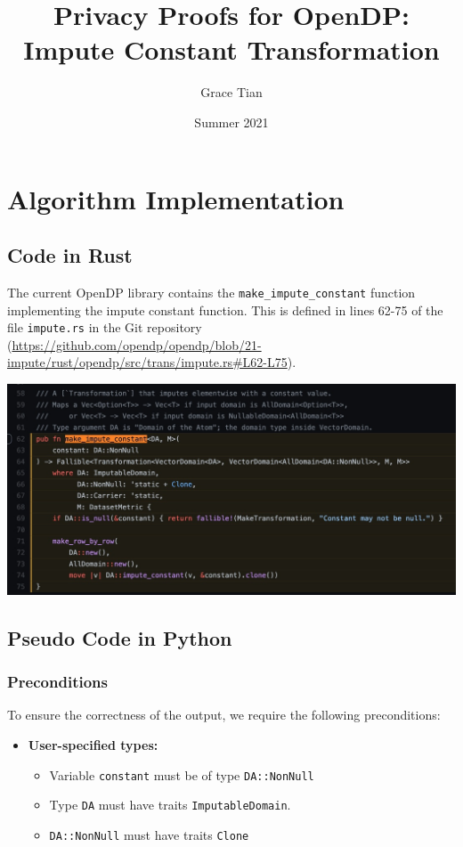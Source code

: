 \documentclass[11pt,a4paper]{article}
\title{Privacy Proofs for OpenDP: Impute Constant Transformation}
\author{Grace Tian}
\date{Summer 2021}
\begin{document}
\maketitle
\tableofcontents

\section{Algorithm Implementation}
\subsection{Code in Rust}
The current OpenDP library contains the \texttt{make\_impute\_constant} function implementing the impute constant function. This is defined in lines 62-75 of the file \texttt{impute.rs} in the Git repository (\url{https://github.com/opendp/opendp/blob/21-impute/rust/opendp/src/trans/impute.rs#L62-L75}).

\includegraphics[width=\textwidth]{make_impute_constant.jpg}


\subsection{Pseudo Code in Python}\label{sec:pseudocode}

\subsubsection*{Preconditions}
To ensure the correctness of the output, we require the following preconditions:

\begin{itemize}
    \item \textbf{User-specified types:}
    \begin{itemize}
        \item Variable \texttt{\texttt{constant}} must be of type \texttt{DA::NonNull}
        \item Type \texttt{DA} must have traits \texttt{ImputableDomain}. %
        \item \texttt{DA::NonNull} must have traits \texttt{Clone}
    \end{itemize}
\end{itemize}
\end{document}
